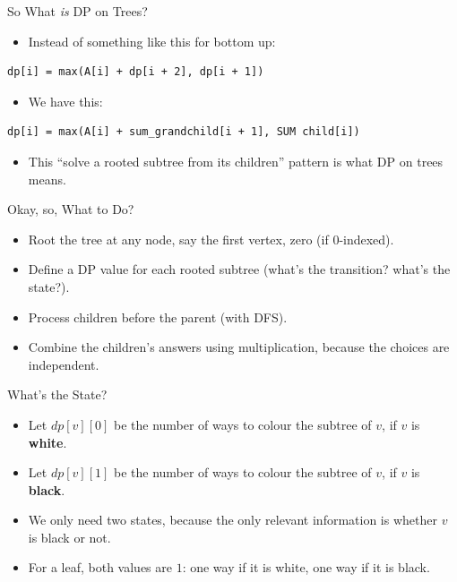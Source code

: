 \documentclass{beamer}
\begin{document}
\begin{frame}[fragile]{So What \textit{is} DP on Trees?}
    \begin{itemize}
        \item Instead of something like this for bottom up:
    \end{itemize}

    \begin{Verbatim}[fontsize=\small]
dp[i] = max(A[i] + dp[i + 2], dp[i + 1])
    \end{Verbatim}

    \begin{itemize}
        \item We have this:
    \end{itemize}

    \begin{Verbatim}[fontsize=\small]
dp[i] = max(A[i] + sum_grandchild[i + 1], SUM child[i])
    \end{Verbatim}

    \begin{itemize}
        \item This ``solve a rooted subtree from its children'' pattern is what DP on trees means.
    \end{itemize}
\end{frame}

\begin{frame}{Okay, so, What to Do?}
    \begin{itemize}
        \item Root the tree at any node, say the first vertex, zero (if 0-indexed).
        \item Define a DP value for each rooted subtree (what's the transition? what's the state?).
        \item Process children before the parent (with DFS).
        \item Combine the children's answers using multiplication, because the choices are independent.
    \end{itemize}
\end{frame}

\begin{frame}{What's the State?}
    \begin{itemize}
        \item Let \(dp[v][0]\) be the number of ways to colour the subtree of \(v\), if \(v\) is \textbf{white}.
        \item Let \(dp[v][1]\) be the number of ways to colour the subtree of \(v\), if \(v\) is \textbf{black}.
        \item We only need two states, because the only relevant information is whether \(v\) is black or not.
        \item For a leaf, both values are \(1\): one way if it is white, one way if it is black.
    \end{itemize}
\end{frame}
\end{document}

